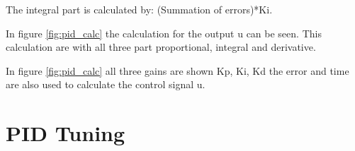 
The integral part is calculated by: (Summation of errors)*Ki. 

In figure \ref{fig:pid_calc} the calculation for the output u can be seen. This calculation are with all three part proportional, integral and derivative.


In figure \ref{fig:pid_calc} all three gains are shown {Kp, Ki, Kd} the error and time are also used to calculate the control signal u.

\section{PID Tuning}


